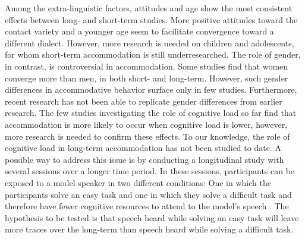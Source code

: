 \documentclass[output=paper,
modfonts
]{langscibook}
\begin{document}
Among the extra-linguistic factors, attitudes and age show the most consistent effects between long- and short-term studies. More positive attitudes toward the contact variety and a younger age seem to facilitate convergence toward a different dialect. However, more research is needed on children and adolescents, for whom short-term accommodation is still underresearched. The role of gender, in contrast, is controversial in accommodation. Some studies find that women converge more than men, in both short- and long-term. However, such gender differences in accommodative behavior surface only in few studies. Furthermore, recent research has not been able to replicate gender differences from earlier research. The few studies investigating the role of cognitive load so far find that accommodation is more likely to occur when cognitive load is lower, however, more research is needed to confirm these effects. To our knowledge, the role of cognitive load in long-term accommodation has not been studied to date. A possible way to address this issue is by conducting a longitudinal study with several sessions over a longer time period. In these sessions, participants can be exposed to a model speaker in two different conditions: One in which the participants solve an easy task and one in which they solve a difficult task and therefore have fewer cognitive resources to attend to the model's speech \citep[see][]{abel_effect_2015}. The hypothesis to be tested is that speech heard while solving an easy task will leave more traces over the long-term than speech heard while solving a difficult task.
% 
% 
% 
% 
% 
% 
\end{document}
